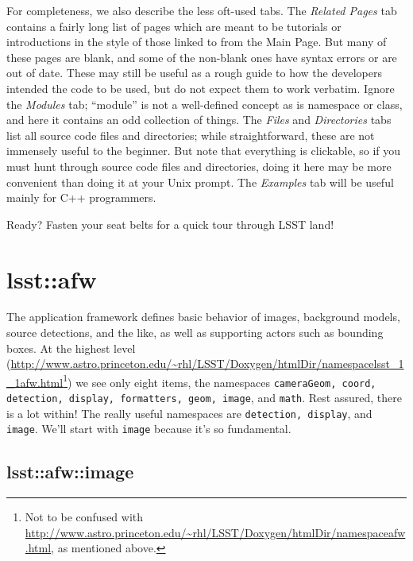 \documentclass{book}
\begin{document}
For completeness, we also describe the less oft-used tabs.  The {\it
  Related Pages} tab contains a fairly long list of pages which are
meant to be tutorials or introductions in the style of those linked to
from the Main Page.  But many of these pages are blank, and some of
the non-blank ones have syntax errors or are out of date.  These may
still be useful as a rough guide to how the developers intended the
code to be used, but do not expect them to work verbatim.  Ignore the
{\it Modules} tab; ``module'' is not a well-defined concept as is
namespace or class, and here it contains an odd collection of things.
The {\it Files} and {\it Directories} tabs list all source code files and
directories; while straightforward, these are not immensely useful to
the beginner.  But note that everything is clickable, so if you must
hunt through source code files and directories, doing it here may be
more convenient than doing it at your Unix prompt.  The {\it Examples}
tab will be useful mainly for C++ programmers.

Ready?  Fasten your seat belts for a quick tour through LSST land!

\section{lsst::afw}

The application framework defines basic behavior of images, background
models, source detections, and the like, as well as supporting actors
such as bounding boxes. At the highest level (\url{http://www.astro.princeton.edu/~rhl/LSST/Doxygen/htmlDir/namespacelsst_1_1afw.html}\footnote{Not
  to be confused with
  \url{http://www.astro.princeton.edu/~rhl/LSST/Doxygen/htmlDir/namespaceafw.html},
  as mentioned above.}) we see only eight items, the namespaces
\texttt{cameraGeom, coord, detection, display, formatters, geom,
  image}, and \texttt{math}.  Rest assured, there is a lot within!
The really useful namespaces are \texttt{detection, display}, and
\texttt{image}.  We'll start with \texttt{image} because it's so
fundamental.


\subsection{lsst::afw::image}
\end{document}
